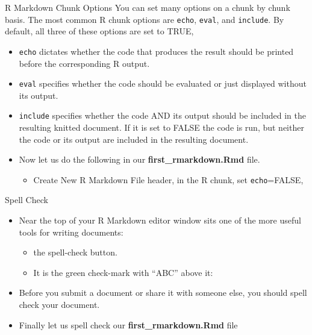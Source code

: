 \documentclass[
  ignorenonframetext,
]{beamer}
\providecommand{\tightlist}{%
  \setlength{\itemsep}{0pt}\setlength{\parskip}{0pt}}
\begin{document}
\begin{frame}[fragile]{R Markdown Chunk Options}
\protect\hypertarget{r-markdown-chunk-options}{}
You can set many options on a chunk by chunk basis. The most common R
chunk options are \texttt{echo}, \texttt{eval}, and \texttt{include}. By
default, all three of these options are set to TRUE,

\begin{itemize}
\item
  \texttt{echo} dictates whether the code that produces the result
  should be printed before the corresponding R output.
\item
  \texttt{eval} specifies whether the code should be evaluated or just
  displayed without its output.
\item
  \texttt{include} specifies whether the code AND its output should be
  included in the resulting knitted document. If it is set to FALSE the
  code is run, but neither the code or its output are included in the
  resulting document.
\item
  Now let us do the following in our \textbf{first\_rmarkdown.Rmd} file.

  \begin{itemize}
  \tightlist
  \item
    Create New R Markdown File header, in the R chunk, set
    \texttt{echo}=FALSE,
  \end{itemize}
\end{itemize}
\end{frame}

\begin{frame}{Spell Check}
\protect\hypertarget{spell-check}{}
\begin{itemize}
\item
  Near the top of your R Markdown editor window sits one of the more
  useful tools for writing documents:

  \begin{itemize}
  \tightlist
  \item
    the spell-check button.
  \item
    It is the green check-mark with ``ABC'' above it:
  \end{itemize}
\item
  Before you submit a document or share it with someone else, you should
  spell check your document.
\item
  Finally let us spell check our \textbf{first\_rmarkdown.Rmd} file
\end{itemize}
\end{frame}
\end{document}
